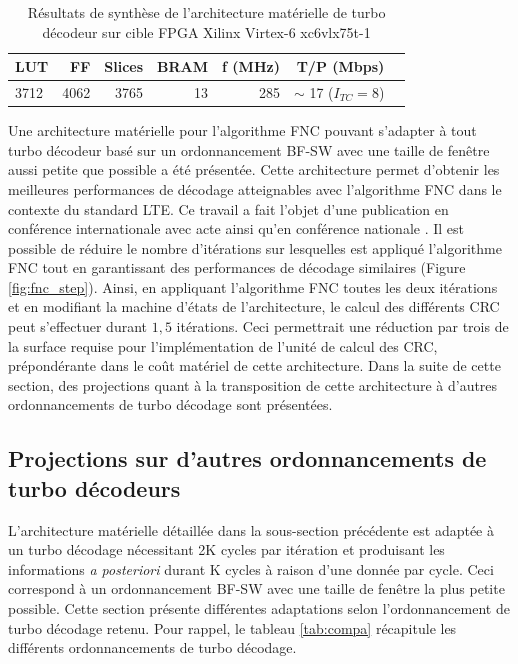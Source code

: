 \begin{table}[!b]
	\centering
	\caption{Résultats de synthèse de l'architecture matérielle de turbo décodeur %
	sur cible FPGA 
	Xilinx Virtex-6 xc6vlx75t-1}
	\label{tab:fnc_ip_xilinx}
	\begin{tabular}{lrrrrrr} 
		\toprule
		LUT & FF & Slices & BRAM & f (MHz)& T/P (Mbps) \\ 
		\midrule
		3712 & 4062 & 3765 & 13 & 285 & $\sim$ 17 ($I_{TC} = 8$)\\ 
		\bottomrule 
	\end{tabular}
\end{table}

Une architecture matérielle pour l'algorithme FNC pouvant s'adapter à tout turbo décodeur basé sur un
ordonnancement BF-SW avec une taille de fenêtre aussi petite que possible a été présentée. Cette architecture permet d'obtenir 
les meilleures performances de décodage atteignables avec l'algorithme FNC dans le contexte du standard LTE. Ce travail 
a fait l'objet d'une publication en
conférence internationale avec acte  ainsi qu'en conférence nationale . Il est possible de réduire le nombre d'itérations sur lesquelles 
est appliqué l’algorithme FNC tout en garantissant des performances de décodage similaires (Figure \ref{fig:fnc_step}).
Ainsi, en appliquant l'algorithme FNC toutes les deux itérations et en modifiant la machine d'états de l'architecture, 
le calcul des différents CRC peut s'effectuer durant $1,5$ itérations. Ceci permettrait une réduction  par 
trois de la surface 
requise pour l'implémentation de l'unité de calcul des CRC, prépondérante dans le coût matériel de cette architecture. 
Dans la suite de cette section, des
projections quant à la transposition de cette architecture à d'autres ordonnancements de turbo décodage sont présentées.

\subsection{Projections sur d'autres ordonnancements de turbo décodeurs}
L'architecture matérielle détaillée dans la sous-section précédente est adaptée à un turbo décodage nécessitant 2K 
cycles par itération et produisant les informations \textit{a posteriori} durant K cycles à raison d'une donnée par 
cycle. Ceci correspond à un ordonnancement BF-SW avec une taille de fenêtre la plus petite possible. Cette section présente 
différentes adaptations selon l'ordonnancement de turbo décodage retenu. Pour rappel, le tableau \ref{tab:compa} récapitule
les différents ordonnancements de turbo décodage.

